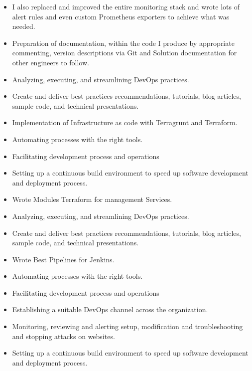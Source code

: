
\begin{itemize}
    \item I also replaced and improved the entire monitoring stack and wrote lots of alert rules and even custom Prometheus exporters to achieve what was needed.
    \item Preparation of documentation, within the code I produce by appropriate commenting, version descriptions via Git and Solution documentation for other engineers to follow.
    \item Analyzing, executing, and streamlining DevOps practices.
    \item Create and deliver best practices recommendations, tutorials, blog articles, sample code, and technical presentations.
    \item Implementation of Infrastructure as code with Terragrunt and Terraform.
    \item Automating processes with the right tools.
    \item Facilitating development process and operations
    \item Setting up a continuous build environment to speed up software development and deployment process.
\end{itemize}

\divider

\begin{itemize}
    \item Wrote Modules Terraform for management Services.
    \item Analyzing, executing, and streamlining DevOps practices.
    \item Create and deliver best practices recommendations, tutorials, blog articles, sample code, and technical presentations.
    \item Wrote Best Pipelines for Jenkins.
    \item Automating processes with the right tools.
    \item Facilitating development process and operations
    \item Establishing a suitable DevOps channel across the organization.
    \item Monitoring, reviewing and alerting setup, modification and troubleshooting and stopping attacks on websites.
    \item Setting up a continuous build environment to speed up software development and deployment process.
\end{itemize}

